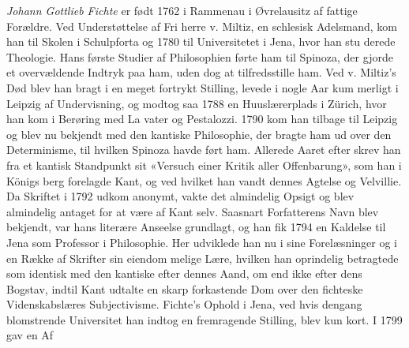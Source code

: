 \documentclass[12pt,a4paper]{book}
\begin{document}
\emph{Johann Gottlieb Fichte} er født 1762 i Rammenau i
Øvrelausitz af fattige Forældre. Ved Understøttelse af Fri\-%
herre v. Miltiz, en schlesisk Adelsmand, kom han til Skolen i
Schulpforta og 1780 til Universitetet i Jena, hvor han stu\-%
derede Theologie. Hans første Studier af Philosophien førte
ham til Spinoza, der gjorde et overvældende Indtryk paa ham,
uden dog at tilfredsstille ham. Ved v. Miltiz's Død blev han
bragt i en meget fortrykt Stilling, levede i nogle Aar kum\-%
merligt i Leipzig af Undervisning, og modtog saa 1788 en
Huuslærerplads i Zürich, hvor han kom i Berøring med La\-%
vater og Pestalozzi. 1790 kom han tilbage til Leipzig og blev
nu bekjendt med den kantiske Philosophie, der bragte ham
ud over den Determinisme, til hvilken Spinoza havde ført ham.
Allerede Aaret efter skrev han fra et kantisk Standpunkt sit
«Versuch einer Kritik aller Offenbarung», som han i Königs\-%
berg forelagde Kant, og ved hvilket han vandt dennes Agtelse
og Velvillie. Da Skriftet i 1792 udkom anonymt, vakte det
almindelig Opsigt og blev almindelig antaget for at være af
Kant selv. Saasnart Forfatterens Navn blev bekjendt, var
hans literære Anseelse grundlagt, og han fik 1794 en Kaldelse
til Jena som Professor i Philosophie. Her udviklede han nu
i sine Forelæsninger og i en Række af Skrifter sin eiendom\-%
melige Lære, hvilken han oprindelig betragtede som identisk
med den kantiske efter dennes Aand, om end ikke efter dens
Bogstav, indtil Kant udtalte en skarp forkastende Dom over
den fichteske Videnskabslæres Subjectivisme. Fichte's Ophold i
Jena, ved hvis dengang blomstrende Universitet han indtog
en fremragende Stilling, blev kun kort. I 1799 gav en Af\-%
\end{document}

